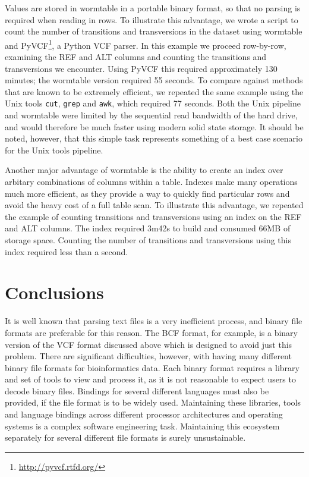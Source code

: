 \documentclass{bioinfo}
\begin{document}
Values are stored in wormtable in a portable binary format, so that no parsing is
required when reading in rows. To illustrate this advantage, we
wrote a script to count the number of transitions and transversions
in the dataset using wormtable and PyVCF\footnote{%
\href{http://pyvcf.rtfd.org/}{http://pyvcf.rtfd.org/}}, 
a Python VCF parser.
In this example we proceed 
row-by-row, examining the REF and ALT columns and
counting the transitions and transversions we encounter. 
Using PyVCF this required approximately 130 minutes;
the wormtable version required
55 seconds. To compare against methods that are known to be extremely
efficient, we repeated the same 
example using the Unix tools \texttt{cut}, \texttt{grep} 
and \texttt{awk},  which required 77 seconds. Both the
Unix pipeline and wormtable were limited by the sequential read
bandwidth of the hard drive, and would therefore be much 
faster using modern solid state storage.
It should be noted, however, that this simple task represents 
something of a best case scenario for the Unix tools pipeline.

Another major advantage of wormtable is the ability to create 
an index over arbitary combinations of columns within a table.
Indexes make many operations much more efficient, as they provide 
a way to quickly find particular rows and avoid the 
heavy cost of a full table scan.
To illustrate this advantage, we repeated the example 
of counting transitions and transversions using an index 
on the REF and ALT columns.
The index required 3m42s to build and 
consumed 66MB of storage space. Counting the number of 
transitions and transversions using this index required 
less than a second.

\section{Conclusions}
It is well known that parsing text files is a very inefficient process, 
and binary file formats are preferable for this reason. The BCF format,
for example, is a binary version of the VCF format discussed above which 
is designed to avoid just this problem. There are significant difficulties,
however, with having many different binary file formats for bioinformatics 
data. Each binary format requires a library and set of tools to view 
and process it, as it is not reasonable to expect users to decode binary
files. Bindings for several different languages must also be provided, if 
the file format is to be widely used.
Maintaining these libraries, tools and language bindings across 
different processor architectures and operating systems
is a complex software engineering task. Maintaining this ecosystem 
separately for several different file formats is surely 
unsustainable.
\end{document}
